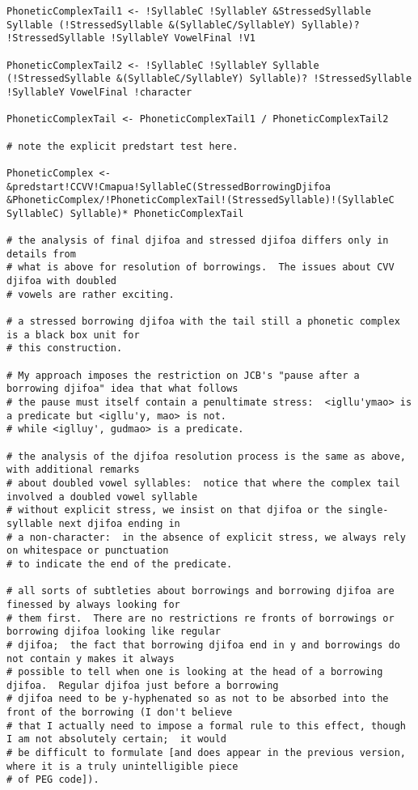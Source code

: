 \documentclass{article}
\begin{document}
\begin{verbatim}
PhoneticComplexTail1 <- !SyllableC !SyllableY &StressedSyllable Syllable (!StressedSyllable &(SyllableC/SyllableY) Syllable)? !StressedSyllable !SyllableY VowelFinal !V1

PhoneticComplexTail2 <- !SyllableC !SyllableY Syllable (!StressedSyllable &(SyllableC/SyllableY) Syllable)? !StressedSyllable !SyllableY VowelFinal !character

PhoneticComplexTail <- PhoneticComplexTail1 / PhoneticComplexTail2

# note the explicit predstart test here.

PhoneticComplex <- &predstart!CCVV!Cmapua!SyllableC(StressedBorrowingDjifoa &PhoneticComplex/!PhoneticComplexTail!(StressedSyllable)!(SyllableC SyllableC) Syllable)* PhoneticComplexTail

# the analysis of final djifoa and stressed djifoa differs only in details from
# what is above for resolution of borrowings.  The issues about CVV djifoa with doubled
# vowels are rather exciting.

# a stressed borrowing djifoa with the tail still a phonetic complex is a black box unit for
# this construction.

# My approach imposes the restriction on JCB's "pause after a borrowing djifoa" idea that what follows
# the pause must itself contain a penultimate stress:  <igllu'ymao> is a predicate but <igllu'y, mao> is not.
# while <iglluy', gudmao> is a predicate.

# the analysis of the djifoa resolution process is the same as above, with additional remarks
# about doubled vowel syllables:  notice that where the complex tail involved a doubled vowel syllable
# without explicit stress, we insist on that djifoa or the single-syllable next djifoa ending in
# a non-character:  in the absence of explicit stress, we always rely on whitespace or punctuation
# to indicate the end of the predicate.

# all sorts of subtleties about borrowings and borrowing djifoa are finessed by always looking for
# them first.  There are no restrictions re fronts of borrowings or borrowing djifoa looking like regular
# djifoa;  the fact that borrowing djifoa end in y and borrowings do not contain y makes it always
# possible to tell when one is looking at the head of a borrowing djifoa.  Regular djifoa just before a borrowing
# djifoa need to be y-hyphenated so as not to be absorbed into the front of the borrowing (I don't believe
# that I actually need to impose a formal rule to this effect, though I am not absolutely certain;  it would
# be difficult to formulate [and does appear in the previous version, where it is a truly unintelligible piece
# of PEG code]).


\end{verbatim}
\end{document}
